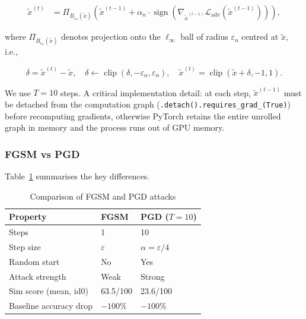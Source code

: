 \documentclass[12pt,a4paper]{article}
\newcommand{\sign}{\operatorname{sign}}
\begin{document}
\begin{align}
  \tilde{x}^{(t)} &=
  \Pi_{B_{\varepsilon_n}(\tilde{x})}\!\left(
    \tilde{x}^{(t-1)}
    + \alpha_n \cdot \sign\!\left(
      \nabla_{\tilde{x}^{(t-1)}} \mathcal{L}_{\text{adv}}(\tilde{x}^{(t-1)})
    \right)
  \right), \label{eq:pgd}
\end{align}

where $\Pi_{B_{\varepsilon_n}(\tilde{x})}$ denotes projection onto the
$\ell_\infty$ ball of radius $\varepsilon_n$ centred at $\tilde{x}$, i.e.,

\begin{equation}
  \delta = \tilde{x}^{(t)} - \tilde{x}, \quad
  \delta \leftarrow \operatorname{clip}(\delta, -\varepsilon_n, \varepsilon_n), \quad
  \tilde{x}^{(t)} = \operatorname{clip}(\tilde{x} + \delta, -1, 1).
  \label{eq:projection}
\end{equation}

We use $T = 10$ steps.  A critical implementation detail: at each step,
$\tilde{x}^{(t-1)}$ must be detached from the computation graph
(\texttt{.detach().requires\_grad\_(True)}) before recomputing gradients,
otherwise PyTorch retains the entire unrolled graph in memory and the process
runs out of GPU memory.

\subsubsection*{FGSM vs PGD}

Table~\ref{tab:attackcomp} summarises the key differences.

\begin{table}[H]
\centering
\caption{Comparison of FGSM and PGD attacks}
\label{tab:attackcomp}
\begin{tabular}{@{}lll@{}}
\toprule
\textbf{Property}       & \textbf{FGSM} & \textbf{PGD ($T=10$)} \\
\midrule
Steps                   & 1             & 10 \\
Step size               & $\varepsilon$ & $\alpha = \varepsilon/4$ \\
Random start            & No            & Yes \\
Attack strength         & Weak          & Strong \\
Sim score (mean, id0)   & 63.5/100      & 23.6/100 \\
Baseline accuracy drop  & $-100\%$      & $-100\%$ \\
\bottomrule
\end{tabular}
\end{table}
\end{document}
